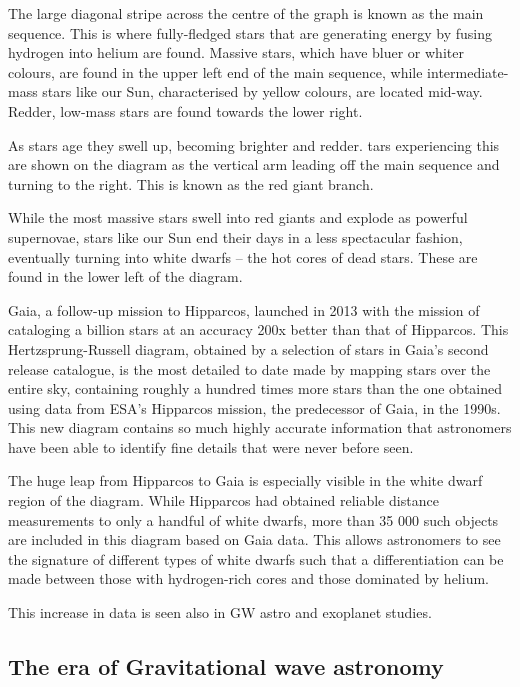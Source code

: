 The large diagonal stripe across the centre of the graph is known as the main sequence. 
This is where fully-fledged stars that are generating energy by fusing hydrogen into helium are found. 
Massive stars, which have bluer or whiter colours, are found in the upper left end of the main sequence, while intermediate-mass stars like our Sun, characterised by yellow colours, are located mid-way. 
Redder, low-mass stars are found towards the lower right.

As stars age they swell up, becoming brighter and redder. 
tars experiencing this are shown on the diagram as the vertical arm leading off the main sequence and turning to the right. 
This is known as the red giant branch.

While the most massive stars swell into red giants and explode as powerful supernovae, stars like our Sun end their days in a less spectacular fashion, eventually turning into white dwarfs – the hot cores of dead stars. 
These are found in the lower left of the diagram.


Gaia, a follow-up mission to Hipparcos, launched in 2013 with the mission of cataloging a billion stars at an accuracy 200x better than that of Hipparcos.
This Hertzsprung-Russell diagram, obtained by a selection of stars in Gaia's second release catalogue, is the most detailed to date made by mapping stars over the entire sky, containing roughly a hundred times more stars than the one obtained using data from ESA's Hipparcos mission, the predecessor of Gaia, in the 1990s. 
This new diagram contains so much highly accurate information that astronomers have been able to identify fine details that were never before seen.

The huge leap from Hipparcos to Gaia is especially visible in the white dwarf region of the diagram. While Hipparcos had obtained reliable distance measurements to only a handful of white dwarfs, more than 35 000 such objects are included in this diagram based on Gaia data. 
This allows astronomers to see the signature of different types of white dwarfs such that a differentiation can be made between those with hydrogen-rich cores and those dominated by helium.


This increase in data is seen also in GW astro and exoplanet studies. 

\subsection{The era of Gravitational wave astronomy}

